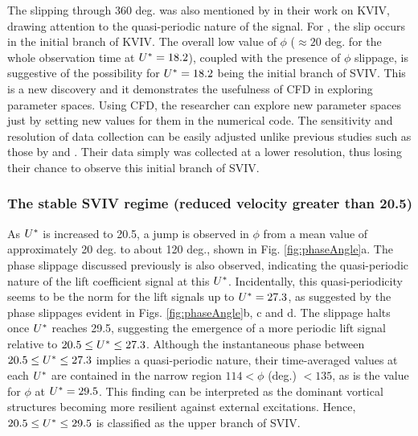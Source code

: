 \documentclass[oneside]{utmthesis}
\begin{document}
\noindent The slipping through 360 deg. was also mentioned by \citet{Khalak1999} in their work on KVIV, drawing attention to the quasi-periodic nature of the signal. For \citet{Khalak1999}, the slip occurs in the initial branch of KVIV. The overall low value of $\phi$ ($\approx 20$ deg. for the whole observation time at $U^{*} = 18.2$), coupled with the presence of $\phi$ slippage, is suggestive of the possibility for $U^{*} = 18.2$ being the initial branch of SVIV. This is a new discovery and it demonstrates the usefulness of CFD in exploring parameter spaces. Using CFD, the researcher can explore new parameter spaces just by setting new values for them in the numerical code. The sensitivity and resolution of data collection can be easily adjusted unlike previous studies such as those by \citet{Koide2009} and \citet{Koide2013}. Their data simply was collected at a lower resolution, thus losing their chance to observe this initial branch of SVIV.

\subsubsection{The stable SVIV regime (reduced velocity greater than 20.5)} \label{sssec:svivRegime}

As $U^{*}$ is increased to 20.5, a jump is observed in $\phi$ from a mean value of approximately 20 deg. to about 120 deg., shown in Fig. \ref{fig:phaseAngle}a. The phase slippage discussed previously is also observed, indicating the quasi-periodic nature of the lift coefficient signal at this $U^{*}$. Incidentally, this quasi-periodicity seems to be the norm for the lift signals up to $U^{*} = 27.3$, as suggested by the phase slippages evident in Figs. \ref{fig:phaseAngle}b, c and d. The slippage halts once $U^{*}$ reaches 29.5, suggesting the emergence of a more periodic lift signal relative to $20.5 \leq U^{*} \leq 27.3$. Although the instantaneous phase between $20.5 \leq U^{*} \leq 27.3$ implies a quasi-periodic nature, their time-averaged values at each $U^{*}$ are contained in the narrow region $114 < \phi$ (deg.) $< 135$, as is the value for $\phi$ at $U^{*} = 29.5$. This finding can be interpreted as the dominant vortical structures becoming more resilient against external excitations. Hence, $20.5 \leq U^{*} \leq 29.5$ is classified as the upper branch of SVIV.
\end{document}
